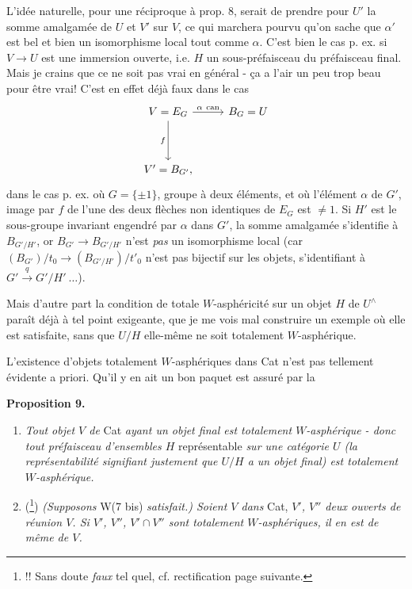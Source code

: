 \documentclass[11pt]{article}
\newcommand{\printedpage}[1]{\marginpar{\footnotesize p.~#1}}
\newcommand{\msp}[1]{\marginpar{\footnotesize [#1]}}
\begin{document}
\msp{page 96}
L'idée naturelle, pour une réciproque à prop. 8, serait de prendre pour $U'$ la somme amalgamée de $U$ et $V'$ sur $V$, ce qui marchera pourvu qu'on sache que $\alpha'$ est bel et bien un isomorphisme local tout comme $\alpha$. C'est bien le cas p. ex. si $V \longrightarrow U$ est une immersion ouverte, i.e. $H$ un sous-préfaisceau du préfaisceau final. Mais je crains que ce ne soit pas vrai en général - ça a l'air un peu trop beau pour être vrai! C'est en effet déjà faux dans le cas
\[
\begin{tikzcd}[row sep=huge]
V = E_G \arrow[r, "\alpha\ \text{can}"] \arrow[d, "f"'] & B_G = U \\
V' = B_{G'}, &
\end{tikzcd}
\]
dans le cas p. ex. où $G = \{\pm 1\}$, groupe à deux éléments, et où l'élément $\alpha$ de $G'$, image par $f$ de l'une des deux flèches non identiques de $E_G$ est $\neq 1$. Si $H'$ est le sous-groupe invariant engendré par $\alpha$ dans $G'$, la somme amalgamée s'identifie à $B_{G'/H'}$, or $B_{G'} \longrightarrow B_{G'/H'}$ n'est \textit{pas} un isomorphisme local (car $(B_{G'})/t_0 \longrightarrow (B_{G'/H'})/t'_0$ n'est pas bijectif sur les objets, s'identifiant à $G' \overset{q}{\longrightarrow} G'/H' \ \ldots$).

Mais d'autre part la condition de totale $W$-asphéricité sur un objet $H$ de $U^{\wedge}$ paraît déjà à tel point exigeante, que je me vois mal con\msp{page 97}struire un exemple où elle est satisfaite, sans que $U/H$ elle-même ne soit totalement $W$-asphérique.

L'existence d'objets totalement $W$-asphériques dans Cat n'est pas tellement évidente a priori. Qu'il y en ait un bon paquet est assuré par la

\setcounter{footnote}{65}

\printedpage{68}

\noindent\textbf{Proposition 9.}

\begin{enumerate}[label=\textit{\alph*)}]
\item \textit{Tout objet $V$ de} Cat \textit{ayant un objet final est totalement $W$-asphérique - donc tout préfaisceau d'ensembles $H$} représentable \textit{sur une catégorie $U$ (la représentabilité signifiant justement que $U/H$ a un objet final) est totalement $W$-asphérique.}

\item (\footnote{!! Sans doute \textit{faux} tel quel, cf. rectification page suivante.}) \textit{(Supposons} W(7 bis) \textit{satisfait.) Soient $V$ dans} Cat, \textit{$V'$, $V''$ deux ouverts de réunion $V$. Si $V'$, $V''$, $V'\cap V''$ sont totalement $W$-asphériques, il en est de même de $V$.}
\end{enumerate}
\end{document}
